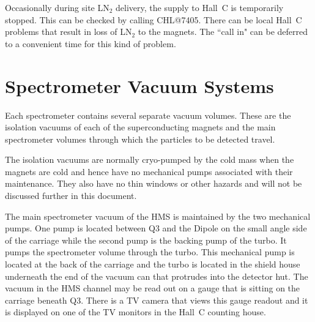 {\begin{description}
\item{}\hskip0.3in Occasionally during site LN$_2$ delivery, the supply to
Hall~C
is temporarily stopped.  This can be checked by calling CHL@7405.  There
can be local Hall~C problems that result in loss of LN$_2$ to the
magnets. The ``call in" can be deferred to a convenient time for this
kind of problem.
\end{description}
%
%

\section{Spectrometer Vacuum Systems}

	Each spectrometer contains several separate vacuum volumes.
These are the isolation vacuums of each of the superconducting
magnets and the main spectrometer volumes through which the particles
to be detected travel.

The isolation vacuums are normally cryo-pumped by the cold mass when the
magnets are cold and hence have no mechanical pumps
associated with their maintenance. They also have no thin
windows or other hazards and will not be discussed further in this document.

The main spectrometer vacuum of the HMS
is maintained by the two mechanical pumps.
One pump is located between Q3 and the Dipole on the small angle
side of the carriage while the second pump is the backing
pump of the turbo. It pumps the spectrometer volume through the turbo.
This mechanical pump is located
at the back of the carriage and the turbo is located in the shield house
underneath the end of the vacuum can that protrudes into the detector hut.
The vacuum in the HMS channel may be read out on a gauge that is sitting on the
carriage beneath Q3. There is a TV camera that views this gauge readout and
it is displayed on one of the TV monitors  in the Hall~C counting house. 

}
